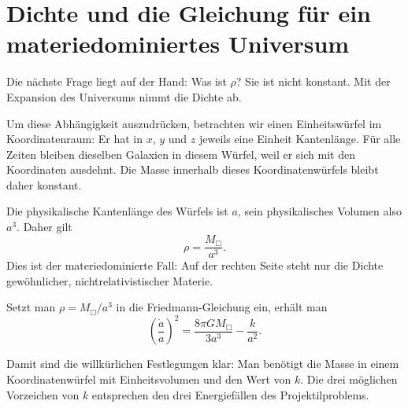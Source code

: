 \section{Dichte und die Gleichung für ein materiedominiertes Universum}

Die nächste Frage liegt auf der Hand: Was ist \(\rho\)? Sie ist nicht konstant. Mit der Expansion des Universums nimmt die Dichte ab.

Um diese Abhängigkeit auszudrücken, betrachten wir einen Einheitswürfel im Koordinatenraum: Er hat in \(x\), \(y\) und \(z\) jeweils eine Einheit Kantenlänge. Für alle Zeiten bleiben dieselben Galaxien in diesem Würfel, weil er sich mit den Koordinaten ausdehnt. Die Masse innerhalb dieses Koordinatenwürfels bleibt daher konstant.


Die physikalische Kantenlänge des Würfels ist \(a\), sein physikalisches Volumen also \(a^3\). Daher gilt
\begin{equation}
\rho=\frac{M_{\Box}}{a^3}.
\end{equation}
Dies ist der materiedominierte Fall: Auf der rechten Seite steht nur die Dichte gewöhnlicher, nichtrelativistischer Materie.

\begin{classroomqa}
\end{classroomqa}

Setzt man \(\rho=M_{\Box}/a^3\) in die Friedmann-Gleichung ein, erhält man
\begin{equation}
\left(\frac{\dot a}{a}\right)^2=\frac{8\pi G M_{\Box}}{3a^3}-\frac{k}{a^2}.
\end{equation}

Damit sind die willkürlichen Festlegungen klar: Man benötigt die Masse in einem Koordinatenwürfel mit Einheitsvolumen und den Wert von \(k\). Die drei möglichen Vorzeichen von \(k\) entsprechen den drei Energiefällen des Projektilproblems.

